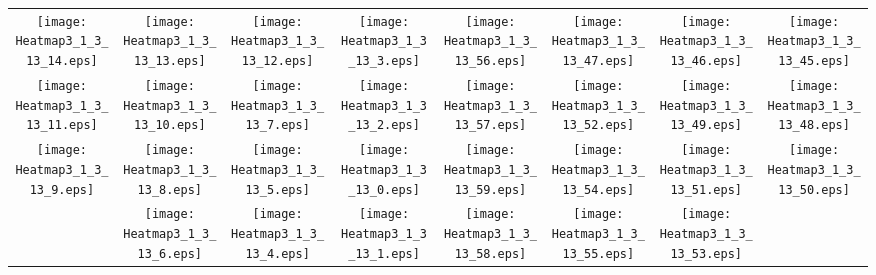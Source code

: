 \documentclass{standalone}
\begin{document}
\begin{tabular}{ *8{c} }
\texttt{[image: Heatmap3\_1\_3\_13\_14.eps]} & \texttt{[image: Heatmap3\_1\_3\_13\_13.eps]} & \texttt{[image: Heatmap3\_1\_3\_13\_12.eps]} & \texttt{[image: Heatmap3\_1\_3\_13\_3.eps]} & \texttt{[image: Heatmap3\_1\_3\_13\_56.eps]} & \texttt{[image: Heatmap3\_1\_3\_13\_47.eps]} & \texttt{[image: Heatmap3\_1\_3\_13\_46.eps]} & \texttt{[image: Heatmap3\_1\_3\_13\_45.eps]} \\
\texttt{[image: Heatmap3\_1\_3\_13\_11.eps]} & \texttt{[image: Heatmap3\_1\_3\_13\_10.eps]} & \texttt{[image: Heatmap3\_1\_3\_13\_7.eps]} & \texttt{[image: Heatmap3\_1\_3\_13\_2.eps]} & \texttt{[image: Heatmap3\_1\_3\_13\_57.eps]} & \texttt{[image: Heatmap3\_1\_3\_13\_52.eps]} & \texttt{[image: Heatmap3\_1\_3\_13\_49.eps]} & \texttt{[image: Heatmap3\_1\_3\_13\_48.eps]} \\
\texttt{[image: Heatmap3\_1\_3\_13\_9.eps]} & \texttt{[image: Heatmap3\_1\_3\_13\_8.eps]} & \texttt{[image: Heatmap3\_1\_3\_13\_5.eps]} & \texttt{[image: Heatmap3\_1\_3\_13\_0.eps]} & \texttt{[image: Heatmap3\_1\_3\_13\_59.eps]} & \texttt{[image: Heatmap3\_1\_3\_13\_54.eps]} & \texttt{[image: Heatmap3\_1\_3\_13\_51.eps]} & \texttt{[image: Heatmap3\_1\_3\_13\_50.eps]} \\
 & \texttt{[image: Heatmap3\_1\_3\_13\_6.eps]} & \texttt{[image: Heatmap3\_1\_3\_13\_4.eps]} & \texttt{[image: Heatmap3\_1\_3\_13\_1.eps]} & \texttt{[image: Heatmap3\_1\_3\_13\_58.eps]} & \texttt{[image: Heatmap3\_1\_3\_13\_55.eps]} & \texttt{[image: Heatmap3\_1\_3\_13\_53.eps]} &  
\end{tabular}
\end{document}
